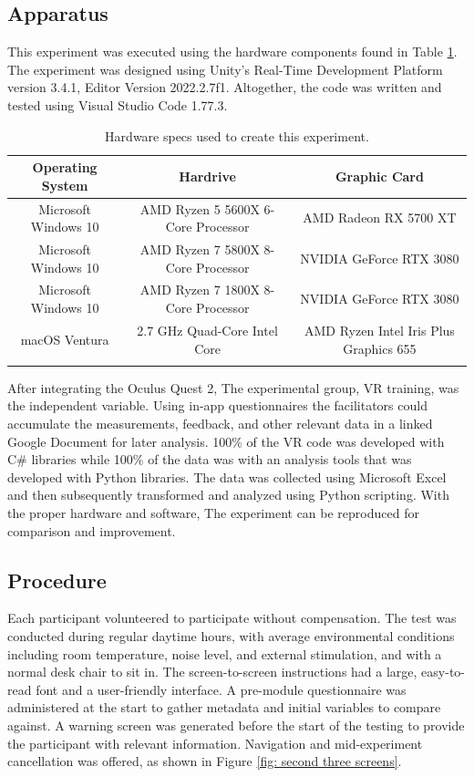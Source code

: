 \documentclass[manuscript]{./Models/acmart}
\begin{document}
\subsection{Apparatus}
This experiment was executed using the hardware components found in Table \ref{tab:hardware}. The experiment was designed using Unity's Real-Time Development Platform version 3.4.1, Editor Version 2022.2.7f1. Altogether, the code was written and tested using Visual Studio Code 1.77.3.

\begin{longtable}[h]{|c|c|c|}
\hline \multicolumn{1}{|c|}{\textbf{Operating System}} & \multicolumn{1}{|c|}{\textbf{Hardrive}} & \multicolumn{1}{|c|}{\textbf{Graphic Card}} \\ \hline
\endhead
\hline \hline

Microsoft Windows 10 & AMD Ryzen 5 5600X 6-Core Processor & AMD Radeon RX 5700 XT \\
Microsoft Windows 10 & AMD Ryzen 7 5800X 8-Core Processor & NVIDIA GeForce RTX 3080 \\
Microsoft Windows 10 & AMD Ryzen 7 1800X 8-Core Processor & NVIDIA GeForce RTX 3080 \\
macOS Ventura & 2.7 GHz Quad-Core Intel Core & AMD Ryzen Intel Iris Plus Graphics 655 \\
\hline
\caption{Hardware specs used to create this experiment.} \label{tab:hardware}
\end{longtable}
\vspace{-4mm}

After integrating the Oculus Quest 2, The experimental group, VR training, was the independent variable. Using in-app questionnaires the facilitators could accumulate the measurements, feedback, and other relevant data in a linked Google Document for later analysis. 100\% of the VR code was developed with C\# libraries while 100\% of the data was with an analysis tools that was developed with Python libraries. The data was collected using Microsoft Excel and then subsequently transformed and analyzed using Python scripting. With the proper hardware and software, The experiment can be reproduced for comparison and improvement.

\subsection{Procedure}
Each participant volunteered to participate without compensation. The test was conducted during regular daytime hours, with average environmental conditions including room temperature, noise level, and external stimulation, and with a normal desk chair to sit in. The screen-to-screen instructions had a large, easy-to-read font and a user-friendly interface. A pre-module questionnaire was administered at the start to gather metadata and initial variables to compare against. A warning screen was generated before the start of the testing to provide the participant with relevant information. Navigation and mid-experiment cancellation was offered, as shown in Figure \ref{fig: second three screens}.
\end{document}
